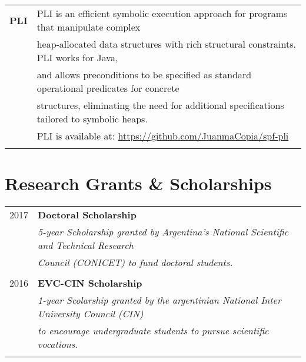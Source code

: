 \documentclass[a4paper,10pt]{article} %
\begin{document}
\begin{longtable}{rl}
\textbf{PLI} & PLI is an efficient symbolic execution approach for programs that manipulate complex \\
& heap-allocated data structures with rich structural constraints. PLI works for Java, \\
& and allows preconditions to be specified as standard operational predicates for concrete \\
& structures, eliminating the need for additional specifications tailored to symbolic heaps. \\
& PLI is available at: \href{https://github.com/JuanmaCopia/spf-pli}{https://github.com/JuanmaCopia/spf-pli} \\ & \\

\end{longtable}

\section{Research Grants \& Scholarships}
\begin{longtable}{rl}

2017 & \textbf{Doctoral Scholarship} \\ 
& \textit{5-year Scholarship granted by Argentina's National Scientific and Technical Research} \\
& \textit{Council (CONICET) to fund doctoral students.} \\ & \\

2016 & \textbf{EVC-CIN Scholarship} \\ 
& \textit{1-year Scolarship granted by the argentinian National Inter University Council (CIN)} \\
& \textit{to encourage undergraduate students to pursue scientific vocations.} \\ & \\

\end{longtable}
\end{document}

